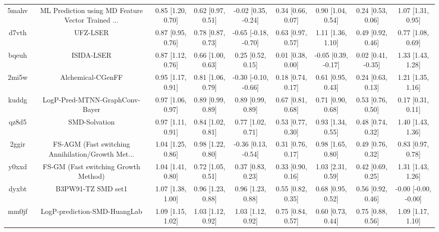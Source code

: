 \documentclass{article}
\begin{document}
\begin{center}
\begin{longtable}{|ccccccccc|}
 5mahv &  ML Prediction using MD Feature Vector Trained ... &  0.85 [1.20, 0.70] &  0.62 [0.97, 0.51] &   -0.02 [0.35, -0.24] &  0.34 [0.66, 0.07] &     0.90 [1.04, 0.54] &     0.24 [0.53, 0.06] &     1.07 [1.31, 0.95] \\
 d7vth &                                           UFZ-LSER &  0.87 [0.95, 0.76] &  0.78 [0.87, 0.73] &  -0.65 [-0.18, -0.70] &  0.63 [0.97, 0.57] &     1.11 [1.36, 1.10] &     0.49 [0.92, 0.46] &     0.77 [1.08, 0.69] \\
 bqeuh &                                         ISIDA-LSER &  0.87 [1.12, 0.76] &  0.66 [1.00, 0.63] &     0.25 [0.52, 0.15] &  0.01 [0.38, 0.00] &   -0.05 [0.39, -0.17] &    0.02 [0.41, -0.35] &     1.33 [1.43, 1.28] \\
 2mi5w &                                  Alchemical-CGenFF &  0.95 [1.17, 0.91] &  0.81 [1.06, 0.79] &  -0.30 [-0.10, -0.66] &  0.18 [0.74, 0.17] &     0.61 [0.95, 0.43] &     0.24 [0.63, 0.13] &     1.21 [1.35, 1.16] \\
 kuddg &                     LogP-Pred-MTNN-GraphConv-Bayer &  0.97 [1.06, 0.97] &  0.89 [0.99, 0.89] &     0.89 [0.99, 0.89] &  0.67 [0.81, 0.68] &     0.71 [0.90, 0.68] &     0.53 [0.76, 0.50] &     0.17 [0.31, 0.11] \\
 qz8d5 &                                      SMD-Solvation &  0.97 [1.11, 0.91] &  0.84 [1.02, 0.81] &     0.77 [1.02, 0.71] &  0.53 [0.77, 0.30] &     0.93 [1.34, 0.55] &     0.48 [0.74, 0.32] &     1.40 [1.43, 1.36] \\
 2ggir &  FS-AGM (Fast switching Annihilation/Growth Met... &  1.04 [1.25, 0.86] &  0.98 [1.22, 0.80] &   -0.36 [0.13, -0.54] &  0.31 [0.76, 0.17] &     0.98 [1.65, 0.80] &     0.49 [0.76, 0.32] &     0.83 [0.97, 0.78] \\
 y0xxd &               FS-GM (Fast switching Growth Method) &  1.04 [1.41, 0.80] &  0.72 [1.05, 0.51] &     0.37 [0.83, 0.23] &  0.33 [0.90, 0.16] &     1.03 [2.31, 0.59] &     0.42 [0.69, 0.25] &     1.31 [1.43, 1.26] \\
 dyxbt &                                 B3PW91-TZ SMD set1 &  1.07 [1.38, 1.00] &  0.96 [1.23, 0.88] &     0.96 [1.23, 0.88] &  0.55 [0.82, 0.35] &     0.68 [0.95, 0.52] &     0.56 [0.92, 0.46] &  -0.00 [-0.00, -0.00] \\
 mm0jf &                       LogP-prediction-SMD-HuangLab &  1.09 [1.15, 1.02] &  1.03 [1.12, 0.92] &     1.03 [1.12, 0.92] &  0.75 [0.84, 0.57] &     0.60 [0.73, 0.44] &     0.75 [0.88, 0.56] &     1.09 [1.17, 1.10] \\

\end{longtable}
\end{center}
\end{document}
